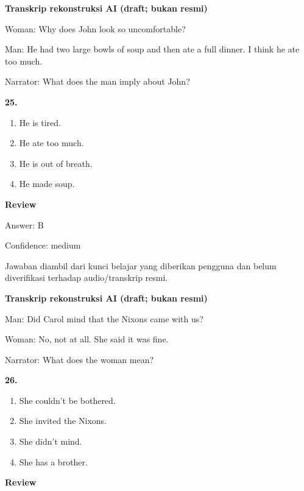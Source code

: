\documentclass[12pt]{article}
\begin{document}
\begin{exampleblock}
\textbf{Transkrip rekonstruksi AI (draft; bukan resmi)}\par
Woman: Why does John look so uncomfortable?\par
Man: He had two large bowls of soup and then ate a full dinner. I think he ate too much.\par
Narrator: What does the man imply about John?\par
\end{exampleblock}
\noindent\textbf{25.}
\begin{enumerate}[label=(\Alph*),leftmargin=*,itemsep=0.2em]
\item He is tired.
\item He ate too much.
\item He is out of breath.
\item He made soup.
\end{enumerate}
\par
\begingroup
\setlength{\parskip}{0pt}
\setlength{\parindent}{0pt}
\textbf{Review}\par
Answer: B\par
Confidence: medium\par
Jawaban diambil dari kunci belajar yang diberikan pengguna dan belum diverifikasi terhadap audio/transkrip resmi.\par
\endgroup
\par
\vspace{0.25\baselineskip}
\begin{exampleblock}
\textbf{Transkrip rekonstruksi AI (draft; bukan resmi)}\par
Man: Did Carol mind that the Nixons came with us?\par
Woman: No, not at all. She said it was fine.\par
Narrator: What does the woman mean?\par
\end{exampleblock}
\noindent\textbf{26.}
\begin{enumerate}[label=(\Alph*),leftmargin=*,itemsep=0.2em]
\item She couldn't be bothered.
\item She invited the Nixons.
\item She didn't mind.
\item She has a brother.
\end{enumerate}
\par
\begingroup
\setlength{\parskip}{0pt}
\setlength{\parindent}{0pt}
\textbf{Review}\par
\end{document}
